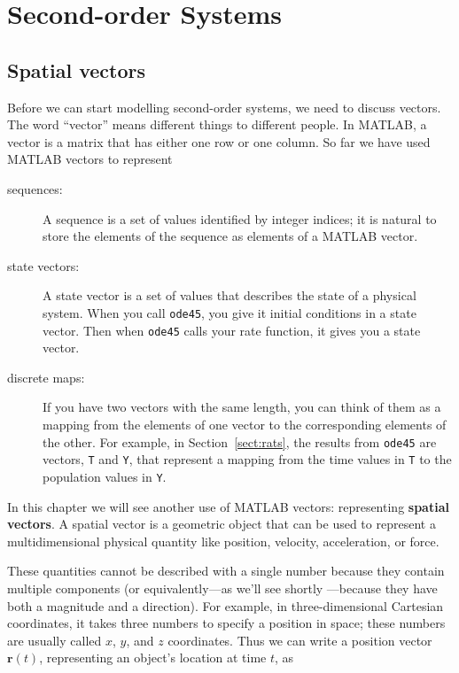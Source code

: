 \documentclass[
]{book}
\renewcommand{\vec}[1]{\bm{\mathbf{#1}}}
\begin{document}
\chapter{Second-order Systems}

\section{Spatial vectors}
\label{sect:spacial}

Before we can start modelling second-order systems,
we need to discuss vectors. The word ``vector'' means different
things to different people.  In MATLAB, a vector is a matrix that has
either one row or one column.  So far we have used MATLAB vectors to
represent

\begin{description}

\item[sequences:] A sequence is a set of values identified by
integer indices; it is natural to store the elements of the
sequence as elements of a MATLAB vector.

\item[state vectors:] A state vector is a set of values that
describes the state of a physical system.  When you call
{\tt ode45}, you give it initial conditions in a state
vector.  Then when {\tt ode45} calls your rate function, it
gives you a state vector.

\item[discrete maps:] If you have two vectors with the same
length, you can think of them as a mapping from the elements
of one vector to the corresponding elements of the other.  For
example, in Section~\ref{sect:rats}, the results from {\tt ode45}
are vectors, {\tt T} and {\tt Y}, that represent a mapping
from the time values in {\tt T} to the population values in {\tt Y}.

\end{description}

In this chapter we will see another use of MATLAB vectors: representing
{\bf spatial vectors}.  A spatial vector is a geometric object that can be used to
represent a multidimensional physical quantity like position, velocity,
acceleration, or force.

These quantities cannot be described with a single number because they
contain multiple components (or equivalently---as we'll see shortly
---because they have both a magnitude and a direction).  For example,
in three-dimensional Cartesian coordinates, it takes three numbers
to specify a position in space; these numbers are usually called $x$,
$y$, and $z$ coordinates. Thus we can write a position vector $\vec{r}(t)$,
representing an object's location at time $t$, as
\end{document}
